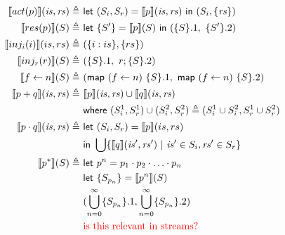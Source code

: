 \documentclass[12pt, letterpaper]{article}
\newcommand\interp[1]{\llbracket #1 \rrbracket}
\begin{document}
\begin{align*}
        \interp { act(p) }(\mathit{is}, \mathit{rs})
            \triangleq\ &
            \mathsf{let}\ (S_i,S_r) = \interp {p}(\mathit{is}, \mathit{rs})\
            \mathsf{in}\ (S_i, \{\mathit{rs}\})
            \\
        \interp { res(p) }(S)
            \triangleq\ &
            \mathsf{let}\ \{S'\} = \interp {p}(S)\ 
            \mathsf{in}\ (\{S\}.1,\ \{S'\}.2)
            \\
        \interp { inj_{i}(i) }(is, rs)
            \triangleq\ &
            (\{i : is\}, \{rs\}) 
            \\
        \interp { inj_{r}(r) }(S)
            \triangleq\ &
            (\{S\}.1,\ r ; \{S\}.2)
            \\
        \interp { f \leftarrow n }(S)
            \triangleq\ &
            (\mathsf{map}\ (f\leftarrow n)\ \{S\}.1,\
             \mathsf{map}\ (f\leftarrow n)\ \{S\}.2)
            \\ %
         \interp { p + q }(\mathit{is}, \mathit{rs})
         \triangleq\ &
         \interp { p }(\mathit{is}, \mathit{rs})\cup
         \interp { q }(\mathit{is}, \mathit{rs}) \\
         &\mathsf{where}\ (S_i^1, S_r^1)\cup (S_i^2, S_r^2)\triangleq
                   (S_i^1\cup S_i^2, S_r^1\cup S_r^2)\\
        \interp { p \cdot q }(\mathit{is}, \mathit{rs})
            \triangleq\ &
            \mathsf{let}\ (S_i, S_r) = \interp{p}(is, rs)\\
            &\mathsf{in}\ \bigcup \{\interp{q}(\mathit{is}',\mathit{rs}')\ |\
                       \mathit{is}'\in S_i, \mathit{rs'}\in S_r\}\\
        \interp { p ^{*} } (S)
            \triangleq\ &
            \mathsf{let}\ p^{n} = p_{1} \cdot p_{2} \cdot \ldots \cdot p_{n}
            \\
            &\mathsf{let}\ \{S_{p_{n}}\} = \interp { p^{n} } (S)
            \\
            &(\bigcup^{\infty}_{n=0} \{S_{p_{n}}\}.1,\bigcup^{\infty}_{n=0} \{S_{p_{n}}\}.2)
            \\
            & \textcolor{red}{\text{is this relevant in streams?}}\\
    \end{align*}
\end{document}
